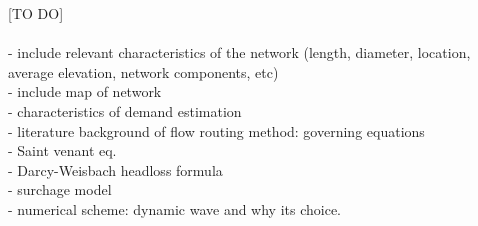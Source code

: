 
[TO DO] \\ \\

- include relevant characteristics of the network (length, diameter, location, average elevation, network components, etc) \\


- include map of network \\
- characteristics of demand estimation\\
- literature background of flow routing method: governing equations \\
- Saint venant eq. \\
- Darcy-Weisbach headloss formula \\
- surchage model \\
- numerical scheme: dynamic wave and why its choice.